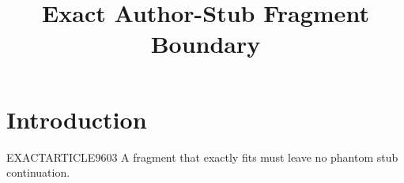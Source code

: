 \documentclass{tnqjournal}
\title{Exact Author-Stub Fragment Boundary}
\begin{document}
\maketitle
\section{Introduction}
EXACTARTICLE9603 A fragment that exactly fits must leave no phantom stub continuation.
\end{document}
